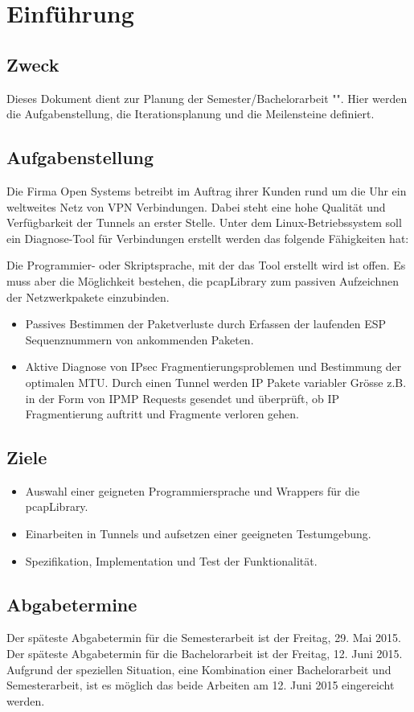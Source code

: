 \section{Einführung}
\label{sec:Einführung}

\subsection{Zweck}
Dieses Dokument dient zur Planung der Semester/Bachelorarbeit "\tool ". Hier werden die Aufgabenstellung, die Iterationsplanung und die Meilensteine definiert.

\subsection{Aufgabenstellung}
Die Firma Open Systems betreibt im Auftrag ihrer Kunden rund um die Uhr ein weltweites Netz von VPN Verbindungen. Dabei steht eine hohe Qualität und Verfügbarkeit der \ipsec Tunnels an erster Stelle.
Unter dem Linux-Betriebssystem soll ein Diagnose-Tool für \ipsec Verbindungen erstellt werden das folgende Fähigkeiten hat:

Die Programmier- oder Skriptsprache, mit der das Tool erstellt wird ist offen. Es muss aber die Möglichkeit bestehen, die pcapLibrary zum passiven Aufzeichnen der Netzwerkpakete einzubinden.

\begin{itemize}
	\item Passives Bestimmen der \ipsec Paketverluste durch Erfassen der laufenden ESP Sequenznummern von ankommenden \ipsec Paketen.
	\item Aktive Diagnose von IPsec Fragmentierungsproblemen und Bestimmung der optimalen MTU. Durch einen Tunnel werden IP Pakete variabler Grösse z.B. in der Form von IPMP Requests gesendet und überprüft, ob \acs{IP} Fragmentierung auftritt und Fragmente verloren gehen.
\end{itemize}

\subsection{Ziele}

\begin{itemize}

  \item Auswahl einer geigneten Programmiersprache und Wrappers für die pcapLibrary.
  \item Einarbeiten in \ipsec Tunnels und aufsetzen einer geeigneten Testumgebung.
  \item Spezifikation, Implementation und Test der \tool Funktionalität.

\end{itemize}

\subsection{Abgabetermine}
Der späteste Abgabetermin für die Semesterarbeit ist der Freitag, 29. Mai 2015.
Der späteste Abgabetermin für die Bachelorarbeit ist der Freitag, 12. Juni 2015.
Aufgrund der speziellen Situation, eine Kombination einer Bachelorarbeit und Semesterarbeit, ist es möglich das beide Arbeiten am 12. Juni 2015 eingereicht werden.
